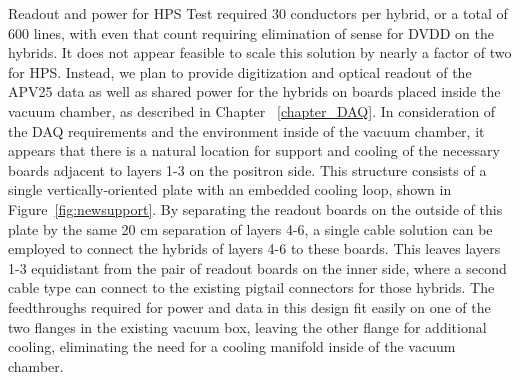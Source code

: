 Readout and power for HPS Test required 30 conductors per hybrid, or a total of 600 lines, with even that count requiring elimination of sense for DVDD on the hybrids.  It does not appear feasible to scale this solution by nearly a factor of two for HPS.  Instead, we plan to provide digitization and optical readout of the APV25 data as well as shared power for the hybrids on boards placed inside the vacuum chamber, as described in Chapter ~\ref{chapter_DAQ}.  In consideration of the DAQ requirements and the environment inside of the vacuum chamber, it appears that there is a natural location for support and cooling of the necessary boards adjacent to layers 1-3 on the positron side.  This structure consists of a single vertically-oriented plate with an embedded cooling loop, shown in Figure~\ref{fig:newsupport}. By separating the readout boards on the outside of this plate by the same 20 cm separation of layers 4-6, a single cable solution can be employed to connect the hybrids of layers 4-6 to these boards.  This leaves layers 1-3 equidistant from the pair of readout boards on the inner side, where a second cable type can connect to the existing pigtail connectors for those hybrids.  The feedthroughs required for power and data in this design fit easily on one of the two flanges in the existing vacuum box, leaving the other flange for additional cooling, eliminating the need for a cooling manifold inside of the vacuum chamber.
